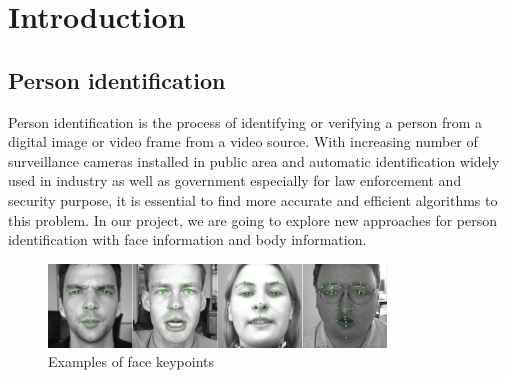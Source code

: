 \documentclass[pdftex,12pt,a4paper]{report}
\begin{document}
\hypersetup{
     colorlinks=true,
     linkcolor=black, 
     citecolor=red
}
\tableofcontents


\hypersetup{
     colorlinks=true,
     linkcolor=red, 
     citecolor=red
}
\chapter*{Introduction}
\section{Person identification}
Person identification is the process of identifying or verifying a person from 
a digital image or video frame from a video source. With increasing number of
surveillance cameras installed in public area and automatic identification
widely used in industry as well as government especially for law enforcement and
security purpose, it is essential to find more accurate and efficient
algorithms to this problem. In our project, we are going to explore new 
approaches for person identification with face information and body information.


\begin{figure}[b]
    \begin{center}
        \includegraphics[width=0.8\textwidth]{./res/facekeypoint}
    \end{center}
    \caption{Examples of face keypoints}
    \label{fig:facekeypoint}
\end{figure}
\end{document}
